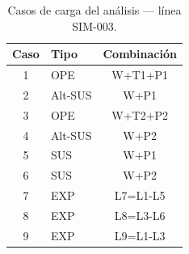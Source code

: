 \begin{table}[htbp]
  \centering
  \small
  \caption{Casos de carga del análisis — línea SIM-003.}
  \label{tab:casos}
  \begin{tabular}{clc}
    \toprule
    Caso & Tipo & Combinaci\'on \\
    \midrule
    1 & OPE & W+T1+P1 \\
    2 & Alt-SUS & W+P1 \\
    3 & OPE & W+T2+P2 \\
    4 & Alt-SUS & W+P2 \\
    5 & SUS & W+P1 \\
    6 & SUS & W+P2 \\
    7 & EXP & L7=L1-L5 \\
    8 & EXP & L8=L3-L6 \\
    9 & EXP & L9=L1-L3 \\
    \bottomrule
  \end{tabular}
\end{table}
